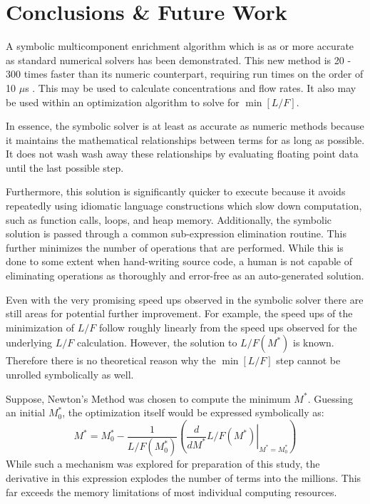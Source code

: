 \documentclass[preprint,12pt]{elsarticle}
\newcommand{\us}[0]{$\mu$s }
\begin{document}
\section{Conclusions \& Future Work}
\label{sec:conc}

A symbolic multicomponent enrichment algorithm which is as or more accurate as 
standard numerical solvers has been demonstrated.  This new method is 20 - 300
times faster than its numeric counterpart, requiring run times on the order of 10 \us.
This may be used to calculate concentrations and flow rates.  It also may be used 
within an optimization algorithm to solve for $\min\left[L/F\right]$.

In essence, the symbolic solver is at least as accurate as numeric methods because
it maintains the mathematical relationships between terms for as long as possible.
It does not wash wash away these relationships by evaluating floating point data
until the last possible step.

Furthermore, this solution is significantly quicker to execute because it avoids
repeatedly using idiomatic language constructions which slow down computation, such
as function calls, loops, and heap memory.  Additionally, the symbolic solution is
passed through a common sub-expression elimination routine.  This further minimizes
the number of operations that are performed.  While this is done to some extent when 
hand-writing source code, a human is not capable of eliminating operations as 
thoroughly and error-free as an auto-generated solution.

Even with the very promising speed ups observed in the symbolic solver there are 
still areas for potential further improvement.  For example, the speed ups of the 
minimization of $L/F$ follow roughly linearly from the speed ups observed for the
underlying $L/F$ calculation.  However, the solution to $L/F(M^*)$ is known.
Therefore there is no theoretical reason why the $\min\left[L/F\right]$ step 
cannot be unrolled symbolically as well.

Suppose, Newton's Method was chosen to compute the minimum $M^*$.  Guessing 
an initial $M_0^*$, the optimization itself would be expressed symbolically as:
\begin{equation}
M^* = M_0^* - \frac{1}{L/F(M_0^*)}\left(\left.\frac{d}{dM^*}L/F(M^*)\right|_{M^*=M_0^*}\right)
\label{mstar-newton-min}
\end{equation}
While such a mechanism was explored for preparation of this study, the derivative
in this expression explodes the number of terms into the millions.  This far exceeds
the memory limitations of most individual computing resources.  
\end{document}

